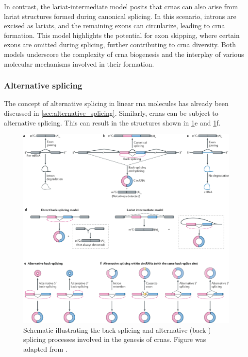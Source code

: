 In contrast, the lariat-intermediate model posits that \glspl{crna} can also
arise from lariat structures formed during canonical splicing.
In this scenario, introns are excised as lariats, and the remaining exons can
circularize, leading to \gls{crna}
formation\supercite{humphreys_ularcirc_2019,barrett_circular_2015}.
This model highlights the potential for exon skipping, where certain exons are
omitted during splicing, further contributing to \gls{crna}
diversity\supercite{sun_microarray_2020,barrett_circular_2015}.
Both models underscore the complexity of \gls{crna} biogenesis and the
interplay of various molecular mechanisms involved in their
formation\supercite{sharma_recent_2021}.

\subsubsection{Alternative splicing}
\label{sec:circrna_alternative_splicing}
The concept of alternative splicing in linear \gls{rna} molecules has already
been discussed in \cref{sec:alternative_splicing}.
Similarly, \glspl{crna} can be subject to alternative splicing.
This can result in the structures shown in \cref{fig:circrna_splicing}e and
\cref{fig:circrna_splicing}f.

\begin{figure}[H]
    \centering

    \includegraphics[width=\textwidth]{chapters/2_background/figures/circRNA-splicing.png}
    \caption{Schematic illustrating the back-splicing and alternative (back-)
        splicing processes involved in the genesis of \glspl{crna}.
        Figure was adapted from \textcite{chen_expanding_2020}.
    }
    \label{fig:circrna_splicing}
\end{figure}

